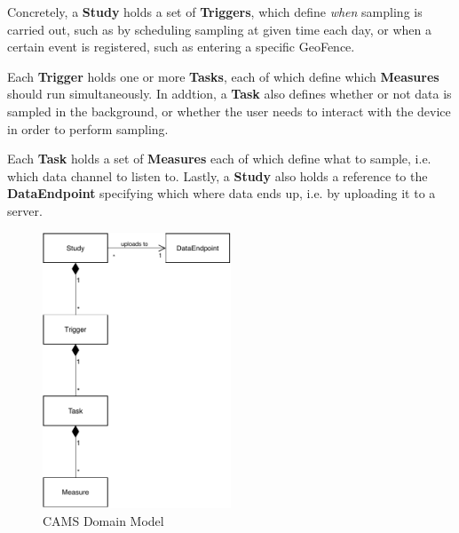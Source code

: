 Concretely, a \textbf{Study} holds a set of \textbf{Triggers}, which define \textit{when} sampling is carried out, such as by scheduling sampling at  given time each day, or when a certain event is registered, such as entering a specific GeoFence. 

Each \textbf{Trigger} holds one or more \textbf{Tasks}, each of which define which \textbf{Measures} should run simultaneously. In addtion, a \textbf{Task} also defines whether or not data is sampled in the background, or whether the user needs to interact with the device in order to perform sampling. 

Each \textbf{Task} holds a set of \textbf{Measures} each of which define what to sample, i.e. which data channel to listen to. Lastly, a \textbf{Study} also holds a reference to the \textbf{DataEndpoint} specifying which where data ends up, i.e. by uploading it to a server.

\begin{figure}
    \centering
    \includegraphics[width=0.5\textwidth]{images/CAMS.pdf}
    \caption{CAMS Domain Model}
    \label{fig:cams_uml}
\end{figure}

